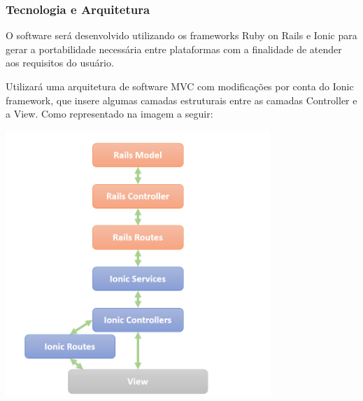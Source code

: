 \subsubsection{Tecnologia e Arquitetura}
\par O software será desenvolvido utilizando os frameworks Ruby on Rails e Ionic para gerar a portabilidade necessária entre plataformas com a finalidade de atender aos requisitos do usuário.
\par Utilizará uma arquitetura de software MVC com modificações por conta do Ionic framework, que insere algumas camadas estruturais entre as camadas Controller e a View. Como representado na imagem a seguir:

\begin{center}
\includegraphics[width=10cm]{figuras/tecnologias}
\end{center}

